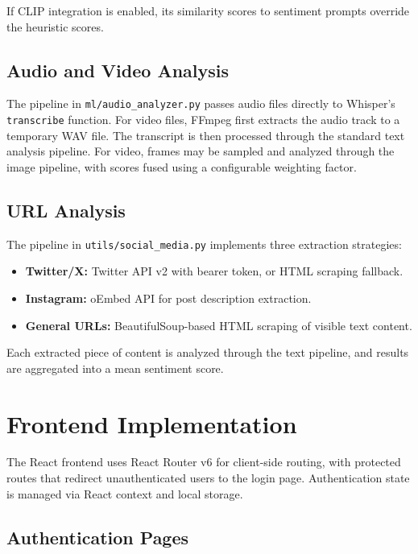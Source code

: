 \documentclass[12pt, a4paper]{report}
\begin{document}
If CLIP integration is enabled, its similarity scores to sentiment prompts override the heuristic scores.

\subsection{Audio and Video Analysis}

The pipeline in \texttt{ml/audio\_analyzer.py} passes audio files directly to Whisper's \texttt{transcribe} function. For video files, FFmpeg first extracts the audio track to a temporary WAV file. The transcript is then processed through the standard text analysis pipeline. For video, frames may be sampled and analyzed through the image pipeline, with scores fused using a configurable weighting factor.

\subsection{URL Analysis}

The pipeline in \texttt{utils/social\_media.py} implements three extraction strategies:

\begin{itemize}[noitemsep, leftmargin=1.5em]
    \item \textbf{Twitter/X:} Twitter API v2 with bearer token, or HTML scraping fallback.
    \item \textbf{Instagram:} oEmbed API for post description extraction.
    \item \textbf{General URLs:} BeautifulSoup-based HTML scraping of visible text content.
\end{itemize}

Each extracted piece of content is analyzed through the text pipeline, and results are aggregated into a mean sentiment score.

\section{Frontend Implementation}

The React frontend uses React Router v6 for client-side routing, with protected routes that redirect unauthenticated users to the login page. Authentication state is managed via React context and local storage.

\subsection{Authentication Pages}
\end{document}
